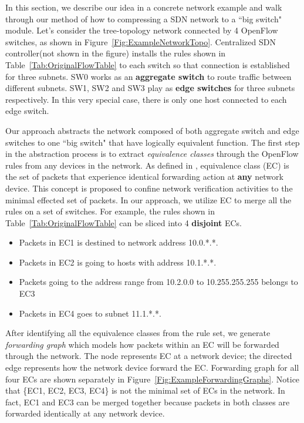 In this section, we describe our idea in a concrete network example and
walk through our method of how to compressing a SDN network to a ``big switch" module.
Let's consider the tree-topology network connected by 4 OpenFlow switches,
as shown in Figure~\ref{Fig:ExampleNetworkTopo}.
Centralized SDN controller(not shown in the figure) installs the rules shown in
Table~\ref{Tab:OriginalFlowTable} to each switch so that connection is established
for three subnets.
SW0 works as an \textbf{aggregate switch} to route traffic between different subnets.
SW1, SW2 and SW3 play as \textbf{edge switches} for three subnets respectively.
In this very special case, there is only one host connected to each edge switch.

Our approach abstracts the network composed of both aggregate switch and edge switches
to one ``big switch" that have logically equivalent function.
The first step in the abstraction process is to extract \textit{equivalence classes}
through the OpenFlow rules from any devices in the network.
As defined in \cite{Veriflow}, equivalence class (EC) is the set of packets that
experience identical forwarding action at \textbf{any} network device.
This concept is proposed to confine network verification activities to the minimal
effected set of packets\cite{Veriflow}.
In our approach, we utilize EC to merge all the rules on a set of switches.
For example, the rules shown in Table~\ref{Tab:OriginalFlowTable} can be sliced into
4 \textbf{disjoint} ECs.
\begin{itemize}
\item Packets in EC1 is destined to network address 10.0.*.*.
\item Packets in EC2 is going to hosts with address 10.1.*.*.
\item Packets going to the address range from 10.2.0.0 to 10.255.255.255 belongs to EC3
\item Packets in EC4 goes to subnet 11.1.*.*. 
\end{itemize}

After identifying all the equivalence classes from the rule set,
we generate \textit{forwarding graph} which models how packets within an EC will be
forwarded through the network\cite{Veriflow}.
The node represents EC at a network device;
the directed edge represents how the network device forward the EC.
Forwarding graph for all four ECs are shown separately in
Figure~\ref{Fig:ExampleForwardingGraphs}.
Notice that \{EC1, EC2, EC3, EC4\} is not the minimal set of ECs in the network.
In fact, EC1 and EC3 can be merged together because packets in both classes are forwarded
identically at any network device.

